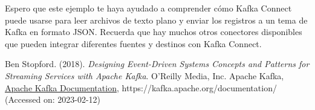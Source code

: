 \documentclass{article}
\begin{document}
Espero que este ejemplo te haya ayudado a comprender cómo Kafka Connect puede usarse para leer archivos de texto plano y enviar los registros a un tema de Kafka en formato JSON. Recuerda que hay muchos otros conectores disponibles que pueden integrar diferentes fuentes y destinos con Kafka Connect.











\newpage
\begin{thebibliography}{9}
Ben Stopford. (2018). \textit{Designing Event-Driven Systems
Concepts and Patterns for Streaming
Services with Apache Kafka}. O'Reilly Media, Inc.
 Apache Kafka, 
\href{https://kafka.apache.org/documentation/}{Apache Kafka Documentation}, https://kafka.apache.org/documentation/ (Accessed on: 2023-02-12)
\end{thebibliography}
\end{document}
